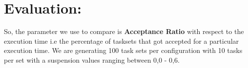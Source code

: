 \documentclass[]{article}
\begin{document}
\section*{Evaluation:}      

{
\raggedleft \newline

So, the parameter we use to compare is \textbf{Acceptance Ratio} with respect to the execution time i.e the percentage of tasksets that got accepted for a particular execution time. We are generating 100 task sets per configuration with 10 tasks per set with a suspension values ranging between 0,0 - 0,6. \newline
}
\end{document}
